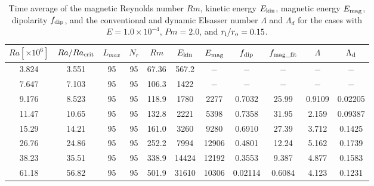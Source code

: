 %
\begin{table}
{\color{red}
\caption{Time average of the magnetic Reynolds number $Rm$, kinetic energy $E_{\rm kin}$, magnetic energy $E_{\rm mag}$, dipolarity $f_{\rm dip}$, and  the conventional and dynamic Elsasser number $\Lambda$ and $\Lambda_{d}$ for the cases with $E = 1.0 \times 10^{-4}$, $Pm = 2.0$, and $r_{\rm i}/r_{\rm o} = 0.15$.}
}
{\color{red}
  \begin{tabular}{ccccccccccc}
    \hline
     $Ra[\times 10^6]$  &  $Ra/Ra_{\rm crit}$& 
     $L_{max}$ & $N_{r}$ & $Rm$ 
     & $E_{\rm kin}$  &  $E_{\rm mag}$ & $f_{\rm dip}$ & $f_{\rm mag\_fit}$ & $\Lambda$ & $\Lambda_{\rm d}$\\
    \hline
      3.824 & 3.551 & 95 & 95 & 67.36 & 567.2 & $-$ & $-$ & $-$ & $-$ & $-$ \\
      7.647 & 7.103 & 95 & 95 & 106.3 & 1422 & $-$ & $-$ & $-$ & $-$ & $-$ \\
      9.176 & 8.523 & 95 & 95 & 118.9 & 1780 & 2277 & 0.7032 & 25.99 & 0.9109 & 0.02205 \\
      11.47 & 10.65 & 95 & 95 & 132.8 & 2221 & 5398 & 0.7358 & 31.95 & 2.159 & 0.09387 \\
      15.29 & 14.21 & 95 & 95 & 161.0 & 3260 & 9280 & 0.6910 & 27.39 & 3.712 & 0.1425 \\
      26.76 & 24.86 & 95 & 95 & 252.2 & 7994 & 12906 & 0.4801 & 12.24 & 5.162 & 0.1739 \\
      38.23 & 35.51 & 95 & 95 & 338.9 & 14424 & 12192 & 0.3553 & 9.387 & 4.877 & 0.1583 \\
      61.18 & 56.82 & 95 & 95 & 501.9 & 31610 & 10306 & 0.02114 & 0.6084 & 4.123 & 0.1231 \\
   \hline
  \end{tabular}
 }
\label{table:Summary_415}
\end{table}
%
%
%
%
